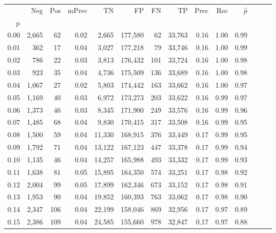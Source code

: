 \begin{tabular}{rrrrrrrrrrrrrr}
\toprule
{} &    Neg &  Pos & mPrec &       TN &       FP &      FN &      TP &  Prec &   Rec & $\hat{p}$ \\
p    &        &      &       &          &          &         &         &       &       &           \\
\midrule
0.00 &  2,665 &   62 &  0.02 &    2,665 &  177,580 &      62 &  33,763 &  0.16 &  1.00 &      0.99 \\
0.01 &    362 &   17 &  0.04 &    3,027 &  177,218 &      79 &  33,746 &  0.16 &  1.00 &      0.99 \\
0.02 &    786 &   22 &  0.03 &    3,813 &  176,432 &     101 &  33,724 &  0.16 &  1.00 &      0.98 \\
0.03 &    923 &   35 &  0.04 &    4,736 &  175,509 &     136 &  33,689 &  0.16 &  1.00 &      0.98 \\
0.04 &  1,067 &   27 &  0.02 &    5,803 &  174,442 &     163 &  33,662 &  0.16 &  1.00 &      0.97 \\
0.05 &  1,169 &   40 &  0.03 &    6,972 &  173,273 &     203 &  33,622 &  0.16 &  0.99 &      0.97 \\
0.06 &  1,373 &   46 &  0.03 &    8,345 &  171,900 &     249 &  33,576 &  0.16 &  0.99 &      0.96 \\
0.07 &  1,485 &   68 &  0.04 &    9,830 &  170,415 &     317 &  33,508 &  0.16 &  0.99 &      0.95 \\
0.08 &  1,500 &   59 &  0.04 &   11,330 &  168,915 &     376 &  33,449 &  0.17 &  0.99 &      0.95 \\
0.09 &  1,792 &   71 &  0.04 &   13,122 &  167,123 &     447 &  33,378 &  0.17 &  0.99 &      0.94 \\
0.10 &  1,135 &   46 &  0.04 &   14,257 &  165,988 &     493 &  33,332 &  0.17 &  0.99 &      0.93 \\
0.11 &  1,638 &   81 &  0.05 &   15,895 &  164,350 &     574 &  33,251 &  0.17 &  0.98 &      0.92 \\
0.12 &  2,004 &   99 &  0.05 &   17,899 &  162,346 &     673 &  33,152 &  0.17 &  0.98 &      0.91 \\
0.13 &  1,953 &   90 &  0.04 &   19,852 &  160,393 &     763 &  33,062 &  0.17 &  0.98 &      0.90 \\
0.14 &  2,347 &  106 &  0.04 &   22,199 &  158,046 &     869 &  32,956 &  0.17 &  0.97 &      0.89 \\
0.15 &  2,386 &  109 &  0.04 &   24,585 &  155,660 &     978 &  32,847 &  0.17 &  0.97 &      0.88 \\

\end{tabular}
